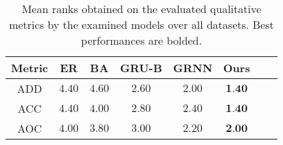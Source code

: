 \begin{table}[h!]
    \footnotesize
    \centering
    \caption{Mean ranks obtained on the evaluated qualitative metrics by the examined models over all datasets. Best performances are bolded.}
    \label{tab:graph-qualitative-rank}
    \renewcommand{\arraystretch}{1.2}
    \begin{tabular}{cccccccc}
          \toprule
          \textbf{Metric} & \textbf{ER} & \textbf{BA} & \textbf{GRU-B} & \textbf{GRNN} & \textbf{Ours} \\
          \midrule
          ADD    & $4.40$ & $4.60$ & $2.60$ & $2.00$ & $\textbf{1.40}$\\
          ACC    & $4.40$ & $4.00$ & $2.80$ & $2.40$ & $\textbf{1.40}$\\
          AOC    & $4.00$ & $3.80$ & $3.00$ & $2.20$ & $\textbf{2.00}$\\
          \bottomrule
    \end{tabular}
\end{table}